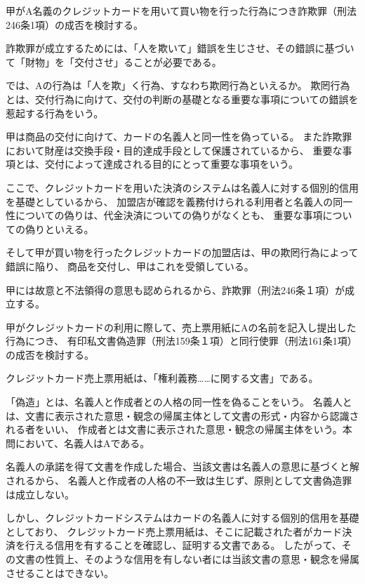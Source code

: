 \documentclass[11pt]{jsarticle}
\title{\vspace{-30mm}{\textgt{\Large{\fbox{13} 一線を越えた男友達}}}}
\date{\vspace{-15mm}}
\begin{document}
\maketitle

	甲がA名義のクレジットカードを用いて買い物を行った行為につき詐欺罪（刑法246条1項）の成否を検討する。
	
	詐欺罪が成立するためには、「人を欺いて」錯誤を生じさせ、その錯誤に基づいて「財物」を「交付させ」ることが必要である。
	
	では、Aの行為は「人を欺」く行為、すなわち欺罔行為といえるか。
	欺罔行為とは、交付行為に向けて、交付の判断の基礎となる重要な事項についての錯誤を惹起する行為をいう。
		
	甲は商品の交付に向けて、カードの名義人と同一性を偽っている。
	また詐欺罪において財産は交換手段・目的達成手段として保護されているから、
	重要な事項とは、交付によって達成される目的にとって重要な事項をいう。
		
	ここで、クレジットカードを用いた決済のシステムは名義人に対する個別的信用を基礎としているから、
	加盟店が確認を義務付けられる利用者と名義人の同一性についての偽りは、代金決済についての偽りがなくとも、
	重要な事項についての偽りといえる。
		
	そして甲が買い物を行ったクレジットカードの加盟店は、甲の欺罔行為によって錯誤に陥り、
	商品を交付し、甲はこれを受領している。
		
	甲には故意と不法領得の意思も認められるから、詐欺罪（刑法246条１項）が成立する。
	
	甲がクレジットカードの利用に際して、売上票用紙にAの名前を記入し提出した行為につき、
	有印私文書偽造罪（刑法159条１項）と同行使罪（刑法161条1項）の成否を検討する。
	
	
		\sectionC{}
			クレジットカード売上票用紙は、「権利義務……に関する文書」である。
	
		\sectionC{}
			「偽造」とは、名義人と作成者との人格の同一性を偽ることをいう。
			名義人とは、文書に表示された意思・観念の帰属主体として文書の形式・内容から認識される者をいい、
			作成者とは文書に表示された意思・観念の帰属主体をいう。本問において、名義人はAである。
		
			名義人の承諾を得て文書を作成した場合、当該文書は名義人の意思に基づくと解されるから、
			名義人と作成者の人格の不一致は生じず、原則として文書偽造罪は成立しない。
		
			しかし、クレジットカードシステムはカードの名義人に対する個別的信用を基礎としており、
			クレジットカード売上票用紙は、そこに記載された者がカード決済を行える信用を有することを確認し、証明する文書である。
			したがって、その文書の性質上、そのような信用を有しない者には当該文書の意思・観念を帰属させることはできない。
		
\end{document}
